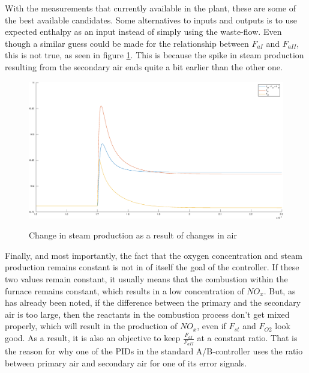 \noindent
With the measurements that currently available in the plant, these are some of the best available candidates. Some alternatives to inputs and outputs is to use expected enthalpy as an input instead of simply using the waste-flow. Even though a similar guess could be made for the relationship between $F_{aI}$ and $F_{aII}$, this is not true, as seen in figure \ref{fig:compare_steam_by_air}. This is because the spike in steam production resulting from the secondary air ends quite a bit earlier than the other one. 

\begin{figure}
  \includegraphics[width=\textwidth]{img/compare_steam_from_air_inputs.eps}
  \label{fig:compare_steam_by_air}
  \caption{Change in steam production as a result of changes in air}
\end{figure}
\noindent
Finally, and most importantly, the fact that the oxygen concentration and steam production remains constant is not in of itself the goal of the controller. If these two values remain constant, it usually means that the combustion within the furnace remains constant, which results in a low concentration of $NO_x$. But, as has already been noted, if the difference between the primary and the secondary air is too large, then the reactants in the combustion process don't get mixed properly, which will result in the production of $NO_x$, even if $F_{st}$ and $F_{O2}$ look good. As a result, it is also an objective to keep $\frac{F_{aI}}{F_{aII}}$ at a constant ratio. That is the reason for why one of the PIDs in the standard A/B-controller uses the ratio between primary air and secondary air for one of its error signals. 


